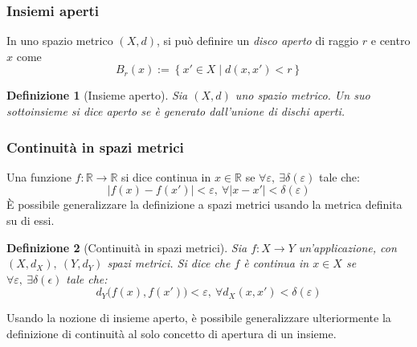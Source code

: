 \documentclass[11pt, a4paper]{scrartcl}
\theoremstyle{style1}
\newtheorem{definizione}{Definizione}[section]
\numberwithin{equation}{subsection}
\begin{document}
\subsubsection{Insiemi aperti}
In uno spazio metrico $(X,d)$, si pu\`o definire un \textit{disco aperto} di raggio $r$ e centro $x$ come
\[
B_r(x) := \left\{ x' \in X  \mid d(x,x') < r \right\} 
\] 
\begin{definizione}
	[Insieme aperto]
	Sia $(X,d)$ uno spazio metrico. Un suo sottoinsieme si dice aperto se \`e generato dall'unione di dischi aperti.
\end{definizione}
\subsubsection{Continuit\`a in spazi metrici}
Una funzione $f:\mathbb{R}\to \mathbb{R}$ si dice continua in $x \in \mathbb{R}$ se $\forall \varepsilon , \ \exists \delta (\varepsilon )$ tale che:
\[
\lvert f(x) - f(x') \rvert < \varepsilon, \ \forall \lvert x-x' \rvert < \delta (\varepsilon )
\] 
\`E possibile generalizzare la definizione a spazi metrici usando la metrica definita su di essi.
\begin{definizione}
	[Continuit\`a in spazi metrici]
Sia $f : X\to Y$ un'applicazione, con $(X,d_X) , \ (Y,d_Y)$ spazi metrici. Si dice che $f$ \`e continua in $x \in X$ se $\forall \varepsilon , \ \exists \delta (\epsilon )$ tale che:
\begin{equation}
	d_Y \big(f(x), f(x')\big) < \varepsilon , \ \forall d_X(x,x')< \delta (\varepsilon )
\end{equation}
\end{definizione}
\noindent Usando la nozione di insieme aperto, \`e possibile generalizzare ulteriormente la definizione di continuit\`a al solo concetto di apertura di un insieme.
\end{document}
